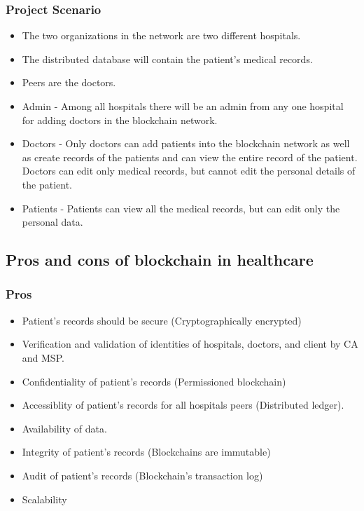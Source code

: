 \documentclass[english,hangout]{beamer}
\begin{document}
\begin{frame}[fragile]
  \frametitle{Project Scenario}
  
  \begin{itemize}
    \item The two organizations in the network are two different hospitals.
    \item The distributed database will contain the patient's medical records.
    \item Peers are the doctors.
    \item Admin - Among all hospitals there will be an admin from any one hospital for adding doctors in the blockchain network.
    \item Doctors - Only doctors can add patients into the blockchain network as well as create records of the patients and can view the entire record of the patient. Doctors can edit only medical records, but cannot edit the personal details of the patient.
    \item Patients - Patients can view all the medical records, but can edit only the personal data.
  \end{itemize}
\end{frame}

\subsection{Pros and cons of blockchain in healthcare}

\begin{frame}
  \frametitle{Pros}
    \begin{itemize}
        \item Patient's records should be secure (Cryptographically encrypted)
        \item Verification and validation of identities of hospitals, doctors, and client by CA and MSP.
        \item Confidentiality of patient's records (Permissioned blockchain)
        \item Accessiblity of patient's records for all hospitals peers (Distributed ledger).
        \item Availability of data.
        \item Integrity of patient's records (Blockchains are immutable)
        \item Audit of patient's records (Blockchain's transaction log)
        \item Scalability
    \end{itemize}

\end{frame}
\end{document}
